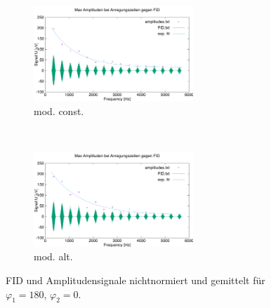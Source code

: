 \documentclass{article}
\begin{document}
        \begin{figure}[H]
            \centering
            \begin{subfigure}[b]{0.4\textwidth}
                \centering
                \includegraphics[width=6cm]{../Bilddateien/CPMG-180-0-constant-avg.png}
                \caption{mod. const.}
                \label{fig:CPMG-180-0-constant-avg}
            \end{subfigure}
            \
            \begin{subfigure}[b]{0.4\textwidth}
                \centering
                \includegraphics[width=6cm]{../Bilddateien/CPMG-180-0-alternating-avg.png}
                \caption{mod. alt.}
                \label{fig:CPMG-180-0-alternating-avg}
            \end{subfigure}
            \caption{FID und Amplitudensignale nichtnormiert und gemittelt für $\varphi_1 = 180$, $\varphi_2 = 0$.}
            \label{fig:CPMG-180-0-avg}
        \end{figure}
\end{document}
